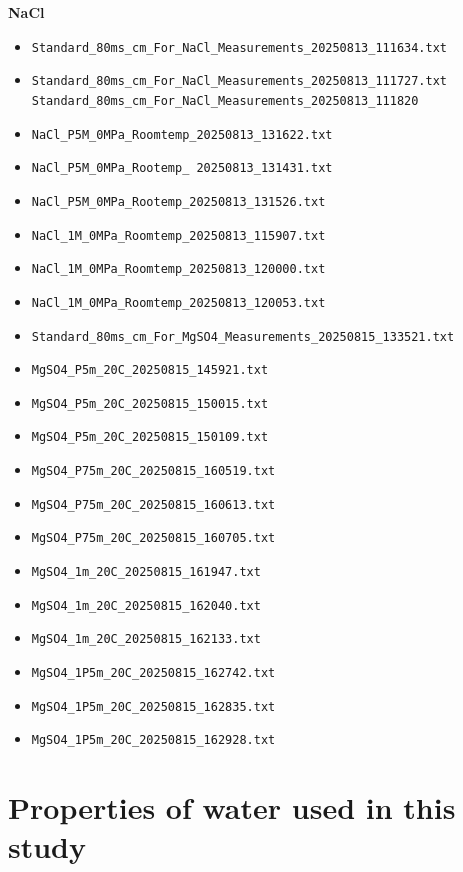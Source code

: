 \documentclass[journal=aesccq,manuscript=suppinfo]{achemso}
\begin{document}
\textbf{NaCl}
\begin{itemize}
  \item \verb|Standard_80ms_cm_For_NaCl_Measurements_20250813_111634.txt|
  \item \verb|Standard_80ms_cm_For_NaCl_Measurements_20250813_111727.txt|
  \verb|Standard_80ms_cm_For_NaCl_Measurements_20250813_111820|
  \item \verb|NaCl_P5M_0MPa_Roomtemp_20250813_131622.txt|
  \item \verb|NaCl_P5M_0MPa_Rootemp_ 20250813_131431.txt|
  \item \verb|NaCl_P5M_0MPa_Rootemp_20250813_131526.txt|
  \item \verb|NaCl_1M_0MPa_Roomtemp_20250813_115907.txt|
  \item \verb|NaCl_1M_0MPa_Roomtemp_20250813_120000.txt|
  \item \verb|NaCl_1M_0MPa_Roomtemp_20250813_120053.txt|
\end{itemize}

\textbf{}
\begin{itemize}
  \item \verb|Standard_80ms_cm_For_MgSO4_Measurements_20250815_133521.txt|
  \item \verb|MgSO4_P5m_20C_20250815_145921.txt|
  \item \verb|MgSO4_P5m_20C_20250815_150015.txt|
  \item \verb|MgSO4_P5m_20C_20250815_150109.txt|
  \item \verb|MgSO4_P75m_20C_20250815_160519.txt|
  \item \verb|MgSO4_P75m_20C_20250815_160613.txt|
  \item \verb|MgSO4_P75m_20C_20250815_160705.txt|
  \item \verb|MgSO4_1m_20C_20250815_161947.txt|
  \item \verb|MgSO4_1m_20C_20250815_162040.txt|
  \item \verb|MgSO4_1m_20C_20250815_162133.txt|
  \item \verb|MgSO4_1P5m_20C_20250815_162742.txt|
  \item \verb|MgSO4_1P5m_20C_20250815_162835.txt|
  \item \verb|MgSO4_1P5m_20C_20250815_162928.txt|
\end{itemize}
\newpage

\section{Properties of water used in this study}
\end{document}
